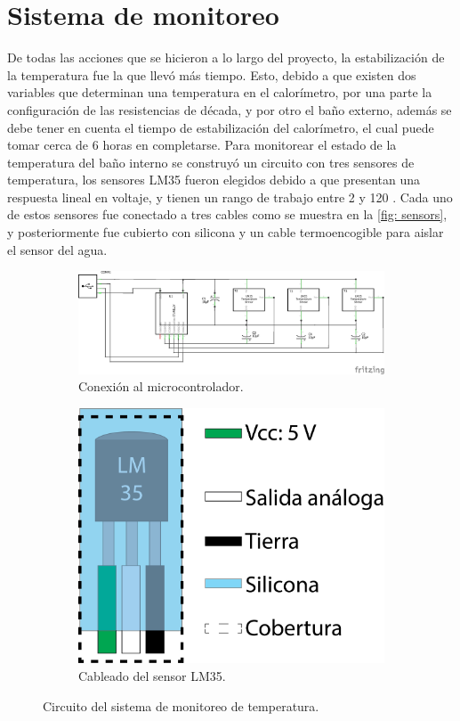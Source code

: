 	\section{Sistema de monitoreo}
	De todas las acciones que se hicieron a lo largo del proyecto, la estabilizaci\'on de la temperatura fue la que llev\'o m\'as tiempo. Esto, debido a que existen dos variables que determinan una temperatura en el calor\'imetro, por una parte la configuraci\'on de las resistencias de d\'ecada, y por otro el ba\~no externo, adem\'as se debe tener en cuenta el tiempo de estabilizaci\'on del calor\'imetro, el cual puede tomar cerca de 6 horas en completarse. Para monitorear el estado de la temperatura del ba\~no interno se construy\'o un circuito con tres sensores de temperatura, los sensores LM35 fueron elegidos debido a que presentan una respuesta lineal en voltaje, y tienen un rango de trabajo entre 2 \grad{} y 120 \grad{} \cite{instruments1999lm35}. Cada uno de estos sensores fue conectado a tres cables como se muestra en la \autoref{fig: sensors}, y posteriormente fue cubierto con silicona y un cable termoencogible para aislar el sensor del agua. 	
	\begin{figure}[h]
		\centering
		\begin{subfigure}{0.75\textwidth}
			\includegraphics[width=\linewidth]{Figures/Sketch_schem}
			\caption{Conexi\'on al microcontrolador.}
			\label{fig: circuito}
		\end{subfigure}
		\begin{subfigure}{0.23\textwidth}
			\includegraphics[width=\linewidth]{Figures/Sensor}
			\caption{Cableado del sensor LM35.}	
			\label{fig: sensors}
		\end{subfigure}
		\caption{Circuito del sistema de monitoreo de temperatura.}	
	\end{figure}

